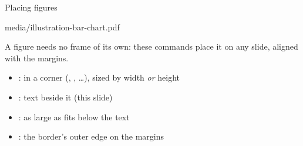 
\begin{standardframe}{Placing figures}
	\begin{besidefigure}[height=4.2cm, border]{media/illustration-bar-chart.pdf}
		{\small\SMLineTop A figure needs no frame of its own: these commands place
		it on any slide, aligned with the margins.\par}
		\smallskip
		\begin{itemize}
			\item {}: in a corner (, , \ldots), sized by width \emph{or} height
			\item {}: text beside it (this slide)
			\item {}: as large as fits below the text
			\item {}: the border's outer edge on the margins
		\end{itemize}
	\end{besidefigure}
\end{standardframe}
